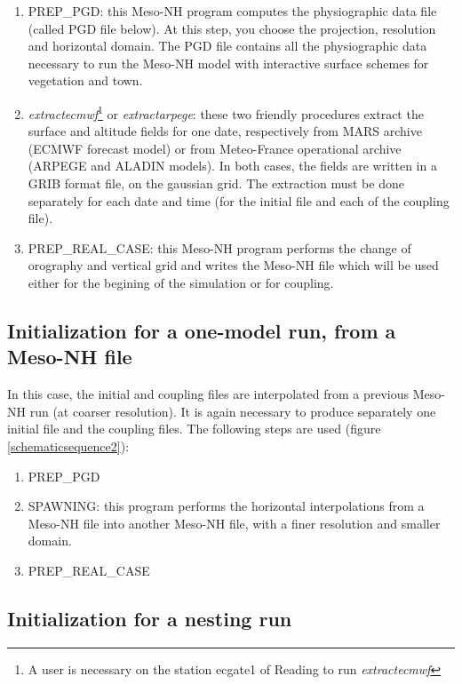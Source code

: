 \begin{enumerate}
\item
{PREP\_PGD}: this Meso-NH program computes the physiographic data file
(called PGD file below). At this step, you choose the projection, resolution
and horizontal domain. The PGD file contains all the physiographic data
necessary to run the Meso-NH model with interactive surface schemes for
vegetation and town.
\item
{\sl extractecmwf}\footnote{A user is necessary on the station ecgate1 of Reading to run
{\sl extractecmwf}} or {\sl extractarpege}: these two friendly procedures extract
the surface and altitude fields for one date, respectively from MARS archive
(ECMWF forecast model) or from
Meteo-France operational archive (ARPEGE and ALADIN models).
In both cases, the fields are written in a GRIB format file, on the gaussian
grid. The extraction must be done separately for each date and time (for
the initial file and each of the coupling file).
\item
{PREP\_REAL\_CASE}: this Meso-NH program performs the change of
orography and vertical grid and writes the Meso-NH file which will be used
either for the begining of the simulation or for coupling.
\end{enumerate}

\subsection{Initialization for a one-model run, from a Meso-NH file}

In this case, the initial and coupling files are interpolated from a
previous Meso-NH run (at coarser resolution). It is again necessary to
produce separately one initial file and the coupling files.
The following steps are used (figure \ref{schematicsequence2}):
\begin{enumerate}
\item
{PREP\_PGD}
\item
{SPAWNING}: this program performs the horizontal interpolations from a
Meso-NH file into another Meso-NH file, with a finer resolution and smaller
domain.
\item
{PREP\_REAL\_CASE}
\end{enumerate}

\subsection{Initialization for a nesting run}


